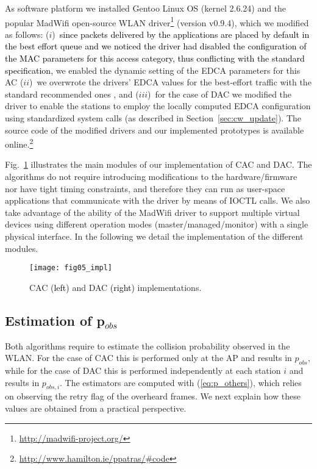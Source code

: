 \documentclass[a4paper,10pt]{article}
\newcommand{\revs}[1]{\textcolor{black}{#1}}
\begin{document}
As software platform we installed Gentoo Linux OS (kernel 2.6.24) and the popular MadWifi open-source WLAN driver\footnote{\url{http://madwifi-project.org/}} (version v0.9.4), which we modified as follows: ($i$)~\revs{since packets delivered by the applications are placed by default in the best effort queue and we noticed the driver had disabled the configuration of the MAC parameters for this access category, thus conflicting with the standard specification,} we enabled the dynamic setting of the EDCA parameters for this AC ($ii$)~we overwrote the drivers' EDCA values for the best-effort traffic with the standard recommended ones \cite{80211revised}, and ($iii$)~for the case of DAC we modified the driver to enable the stations to employ the locally computed EDCA configuration using standardized system calls (as described in Section~\ref{sec:cw_update}). The source code of the modified drivers and our implemented prototypes is available online.\footnote{\url{http://www.hamilton.ie/ppatras/#code}}



Fig.~\ref{fig:implementation} illustrates the main modules of our implementation of CAC and DAC. The algorithms do not require introducing modifications to the hardware/firmware nor have tight timing constraints, and therefore they can run as user-space applications that communicate with the driver by means of {\ttfamily IOCTL} calls. We also take advantage of the ability of the MadWifi driver to support multiple virtual devices using different operation modes (master/managed/monitor) with a single physical interface. In the following we detail the implementation of the different modules. 

\begin{figure}\texttt{[image: fig05\_impl]}\caption{CAC \revs{(left)} and DAC \revs{(right)} implementations.}\label{fig:implementation}\end{figure}

\subsection{Estimation of p$_{obs}$}

Both algorithms require to estimate the collision probability observed in the WLAN. For the case of CAC this is performed only at the AP and results in $p_{obs}$, while for the case of DAC this is performed independently at each station $i$ and results in $p_{obs,i}$. The estimators are computed with (\ref{eq:p_others}), which relies on observing the retry flag of the overheard frames. We next explain how these values are obtained from a practical perspective. 
\end{document}
